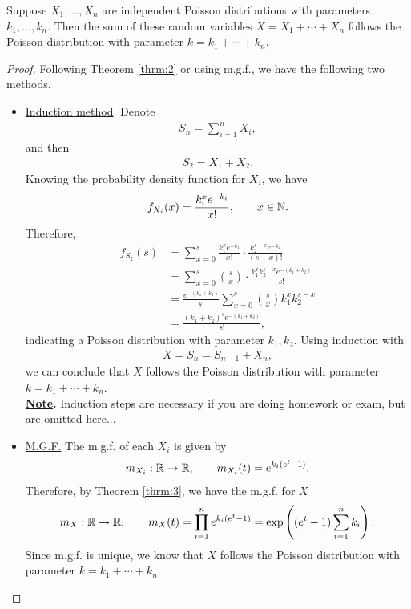 Suppose $X_1, \ldots, X_n$ are independent Poisson distributions with parameters $k_1, \ldots, k_n$. Then the sum of these random variables $X = X_1 + \cdots + X_n$ follows the Poisson distribution with parameter $k = k_1 + \cdots + k_n$. \\
\begin{proof} Following Theorem \ref{thrm:2} or using m.g.f., we have the following two methods.
	\begin{itemize}
		\item \underline{Induction method}. Denote
		\begin{align*}
		S_n = \sum_{i=1}^n X_i,
		\end{align*}
		and then
		\begin{align*}
		S_2 = X_1 + X_2.
		\end{align*}
		Knowing the probability density function for $X_i$, we have
		\begin{align*}
		f_{X_i}(x) = \frac{k_i^xe^{-k_i}}{x!}, \qquad x\in \mathbb{N}.
		\end{align*}
		Therefore,
		\begin{align*}
		f_{S_2}(s) & = \sum_{x=0}^{s} \frac{k_1^xe^{-k_1}}{x!} \cdot \frac{k_2^{s-x}e^{-k_2}}{(s-x)!} \\
		& = \sum_{x=0}^{s} \binom{s}{x} \cdot \frac{k_1^xk_2^{s-x} e^{-(k_1+k_2)}}{s!} \\
		& = \frac{e^{-(k_1+k_2)}}{s!} \sum_{x=0}^s \binom{s}{x} k_1^xk_2^{s-x} \\
		& = \frac{(k_1+k_2)^se^{-(k_1+k_2)}}{s!},
		\end{align*}
		indicating a Poisson distribution with parameter $k_1, k_2$. Using induction with
		\begin{align*}
		X = S_n = S_{n-1} + X_n,
		\end{align*}
		we can conclude that $X$ follows the Poisson distribution with parameter $k = k_1 + \cdots + k_n$.\\
		\textbf{\underline{Note}.} Induction steps are necessary if you are doing homework or exam, but are omitted here...
		\item \underline{M.G.F.} The m.g.f. of each $X_i$ is given by
		\begin{align*}
		m_{X_i}: \mathbb{R}\rightarrow \mathbb{R}, \qquad m_{X_i}(t) = e^{k_i(e^t-1)}.
		\end{align*}
		Therefore, by Theorem \ref{thrm:3}, we have the m.g.f. for $X$
		\begin{align*}
		m_X: \mathbb{R} \rightarrow\mathbb{R}, \qquad m_X(t) = \prod_{i=1}^n e^{k_i(e^t-1)} = \exp\left((e^t-1)\sum_{i=1}^n k_i \right).
		\end{align*}
		Since m.g.f. is unique, we know that $X$ follows the Poisson distribution with parameter $k = k_1 + \cdots + k_n$.
	\end{itemize}
\end{proof}

